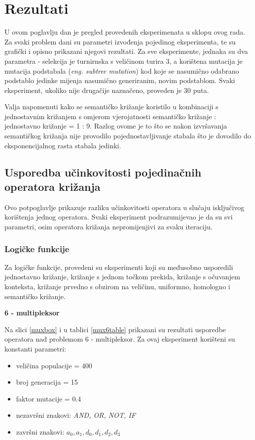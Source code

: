 \section{Rezultati}

U ovom poglavlju dan je pregled provedenih eksperimenata u sklopu ovog rada. Za svaki problem dani su parametri izvođenja pojedinog eksperimenta, te su grafički i opisno prikazani njegovi rezultati. Za sve eksperimente, jednaka su dva parametra - selekcija je turnirnska s veličinom turira 3, a korištena mutacija je mutacija podstabala (\textit{eng. subtree mutation}) kod koje se nasumično odabrano podstablo jedinke mijenja nasumično generiranim, novim podstablom. Svaki eksperiment, ukoliko nije drugačije naznačeno, proveden je 30 puta.

Valja napomenuti kako se semantičko križanje koristilo u kombinaciji s jednostavnim križanjem s omjerom vjerojatnosti semantičko križanje : jednostavno križanje = 1 : 9. Razlog ovome je to što se nakon izvršavanja semantičkog križanja nije provodilo pojednostavljivanje stabala što je dovodilo do eksponencijalnog rasta stabala jedinki.

\subsection{Usporedba učinkovitosti pojedinačnih operatora križanja}

Ovo potpoglavlje prikazuje razliku učinkovitosti operatora u slučaju isključivog korištenja jednog operatora. Svaki eksperiment podrazumijevao je da su svi parametri, osim operatora križanja nepromijenjivi za svaku iteraciju.

\subsubsection{Logičke funkcije}

Za logičke funkcije, provedeni su eksperimenti koji su međusobno usporedili jednostavno križanje, križanje s jednom točkom prekida, križanje s očuvanjem konteksta, križanje prvedno s obzirom na veličinu, uniformno, homologno i semantičko križanje.

\textbf{6 - multipleksor}

Na slici \ref{muxbox} i u tablici \ref{mux6table} prikazani su rezultati usporedbe operatora nad problemom 6 - multipleksor. Za ovaj eksperiment korišteni su konstanti parametri:
\begin{itemize}
\item{veličina populacije = 400}
\item{broj generacija = 15}
\item{faktor mutacije = 0.4}
\item{nezavršni znakovi: \textit{AND, OR, NOT, IF}}
\item{završni znakovi: \textit{$a_0, a_1, d_0, d_1, d_2, d_3$}}
\end{itemize}


